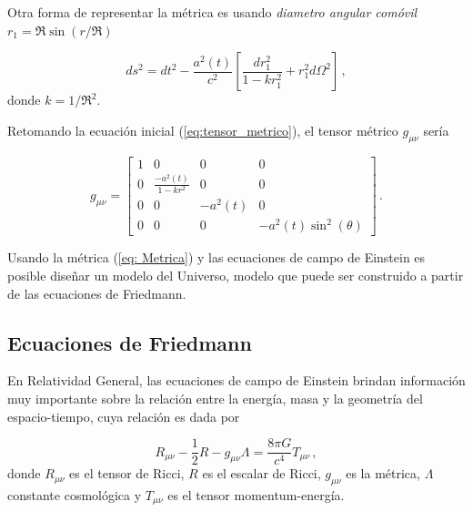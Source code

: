 Otra forma de representar la métrica es usando \textit{diametro angular comóvil} $r_{1}=\Re\sin(r/\Re)$

\begin{equation}
ds^{2}=dt^{2}-\frac{a^{2}(t)}{c^{2}}\left[\frac{dr^{2}_{1}}{1-kr^{2}_{1}}+r^{2}_{1}d\Omega^{2}\right]\,,
\end{equation}
%
donde $k=1/\Re^{2}$.

Retomando la ecuación inicial (\ref{eq:tensor_metrico}), el tensor métrico $g_{\mu\nu}$ sería




\begin{equation}
g_{\mu\nu}=
\begin{bmatrix}
1 & 0 & 0 & 0 \\ 
0 & \frac{-a^{2}(t)}{1-kr^{2}} & 0 & 0 \\ 
0 & 0 & -a^{2}(t)  & 0 \\ 
0 & 0 & 0 & -a^{2}(t)\sin^{2}(\theta)
\end{bmatrix}\,.
\label{eq: Metrica}
\end{equation}

Usando la métrica (\ref{eq: Metrica}) y las ecuaciones de campo de Einstein es posible diseñar un modelo del Universo, modelo que puede ser construido a partir de las ecuaciones de Friedmann. 



\subsection{Ecuaciones de Friedmann}
\label{subsec:Ecuaciones_Friedmann}

En Relatividad General, las ecuaciones de campo de Einstein brindan información muy importante sobre la relación entre la energía, masa y la geometría del espacio-tiempo, cuya relación es dada por 

\begin{equation}
R_{\mu\nu}-\frac{1}{2}R-g_{\mu\nu}\Lambda=\frac{8\pi G}{c^{4}}T_{\mu\nu} \,,
\label{eq:Einstein_campo_ecuacion}
\end{equation}
%
donde $R_{\mu\nu}$ es el tensor de Ricci, $R$ es el escalar de Ricci, $g_{\mu\nu}$ es la métrica, $\Lambda$ constante cosmológica y $T_{\mu\nu}$ es el tensor momentum-energía. 

